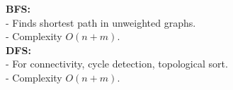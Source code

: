 \textbf{BFS:} \\[1mm]
- Finds shortest path in unweighted graphs. \\
- Complexity $O(n+m)$. \\

\textbf{DFS:} \\[1mm]
- For connectivity, cycle detection, topological sort. \\
- Complexity $O(n+m)$. \\
